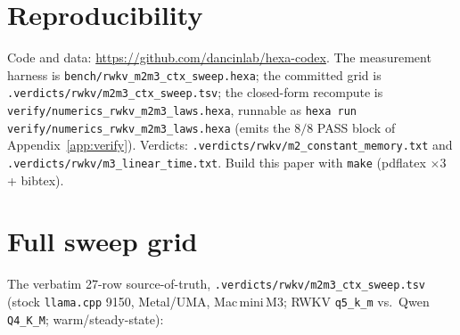 \documentclass[11pt,a4paper]{article}
\begin{document}
\section*{Reproducibility}

Code and data: \url{https://github.com/dancinlab/hexa-codex}. The measurement
harness is \texttt{bench/rwkv\_m2m3\_ctx\_sweep.hexa}; the committed grid is
\texttt{.verdicts/rwkv/m2m3\_ctx\_sweep.tsv}; the closed-form recompute is
\texttt{verify/numerics\_rwkv\_m2m3\_laws.hexa}, runnable as
\texttt{hexa run verify/numerics\_rwkv\_m2m3\_laws.hexa} (emits the \(8/8\) PASS
block of Appendix~\ref{app:verify}). Verdicts:
\texttt{.verdicts/rwkv/m2\_constant\_memory.txt} and
\texttt{.verdicts/rwkv/m3\_linear\_time.txt}. Build this paper with
\texttt{make} (pdflatex \(\times 3\) + bibtex).

\appendix
\section{Full sweep grid}
\label{app:grid}
The verbatim 27-row source-of-truth, \texttt{.verdicts/rwkv/m2m3\_ctx\_sweep.tsv}
(stock \texttt{llama.cpp} 9150, Metal/UMA, Mac\,mini\,M3; RWKV
\texttt{q5\_k\_m} vs.\ Qwen \texttt{Q4\_K\_M}; warm/steady-state):
\end{document}
